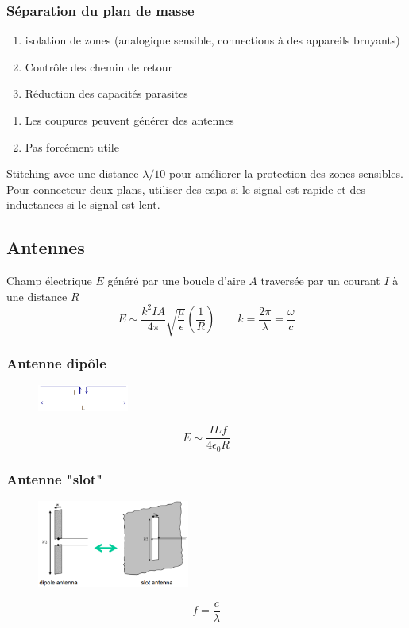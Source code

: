 \documentclass[resume]{subfiles}
\begin{document}
\begin{multicols}{3}
\subsubsection{Séparation du plan de masse}
\begin{multicols}{2}
\begin{enumerate}[label={+}]
\item isolation de zones (analogique sensible, connections à des appareils bruyants)
\item Contrôle des chemin de retour 
\item Réduction des capacités parasites
\end{enumerate}
\begin{enumerate}[label={-}]
\item Les coupures peuvent générer des antennes
\item Pas forcément utile
\end{enumerate}
\end{multicols}
Stitching avec une distance $\lambda/10$ pour améliorer la protection des zones sensibles.\\
Pour connecteur deux plans, utiliser des capa si le signal est rapide et des inductances si le signal est lent.\\
\subsection{Antennes}
Champ électrique $E$ généré par une boucle d'aire $A$ traversée par un courant $I$ à une distance $R$
$$E\sim \frac{k^2 IA}{4\pi}\sqrt{\frac{\mu}{\epsilon}}\left(\frac{1}{R}\right)\qquad k=\frac{2\pi}{\lambda}=\frac{\omega}{c}$$
\subsubsection{Antenne dipôle}
\begin{figure}[H]
\centering
\includegraphics[width=3.00cm]{img_5.png}
\end{figure}
$$E\sim \frac{ILf}{4\epsilon_0 R}$$
\subsubsection{Antenne "slot"}
\begin{figure}[H]
\centering
\includegraphics[width=5.00cm]{img_6.png}
\end{figure}
$$f=\frac{c}{\lambda}$$

\end{multicols}
\end{document}
